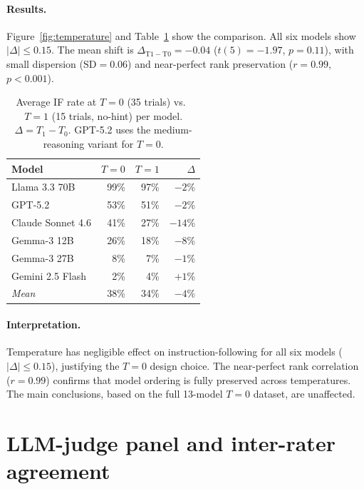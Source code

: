 \paragraph{Results.}
Figure~\ref{fig:temperature} and Table~\ref{tab:temperature} show the comparison. All six models show $|\Delta|\leq 0.15$. The mean shift is $\Delta_{\mathrm{T1}-\mathrm{T0}}{=}{-}0.04$ ($t(5){=}{-}1.97$, $p{=}0.11$), with small dispersion ($\mathrm{SD}{=}0.06$) and near-perfect rank preservation ($r{=}0.99$, $p{<}0.001$).

\begin{table}[h]
\centering
\small
\begin{tabular}{lrrr}
\toprule
\textbf{Model} & $T{=}0$ & $T{=}1$ & $\Delta$ \\
\midrule
Llama 3.3 70B     & 99\% & 97\% & $-2$\%  \\
GPT-5.2           & 53\% & 51\% & $-2$\%  \\
Claude Sonnet 4.6 & 41\% & 27\% & $-14$\% \\
Gemma-3 12B       & 26\% & 18\% & $-8$\%  \\
Gemma-3 27B       & 8\%  & 7\%  & $-1$\%  \\
Gemini 2.5 Flash  & 2\%  & 4\%  & $+1$\%  \\
\midrule
\textit{Mean}     & 38\% & 34\% & $-4$\%  \\
\bottomrule
\end{tabular}
\caption{Average IF rate at $T{=}0$ (35 trials) vs.\ $T{=}1$ (15 trials, no-hint) per model. $\Delta{=}T_1{-}T_0$. GPT-5.2 uses the medium-reasoning variant for $T{=}0$.}
\label{tab:temperature}
\end{table}

\paragraph{Interpretation.}
Temperature has negligible effect on instruction-following for all six models ($|\Delta|\leq 0.15$), justifying the $T{=}0$ design choice. The near-perfect rank correlation ($r{=}0.99$) confirms that model ordering is fully preserved across temperatures. The main conclusions, based on the full 13-model $T{=}0$ dataset, are unaffected.


\section{LLM-judge panel and inter-rater agreement}
\label{app:judges}

